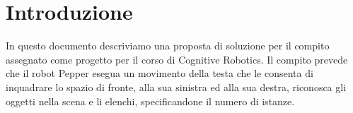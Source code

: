 \section{Introduzione}

In questo documento descriviamo una proposta di soluzione per il compito assegnato come progetto per il corso di Cognitive Robotics. Il compito prevede che il robot Pepper esegua un movimento della testa che le consenta di inquadrare lo spazio di fronte, alla sua sinistra ed alla sua destra, riconosca gli oggetti nella scena e li elenchi, specificandone il numero di istanze. 